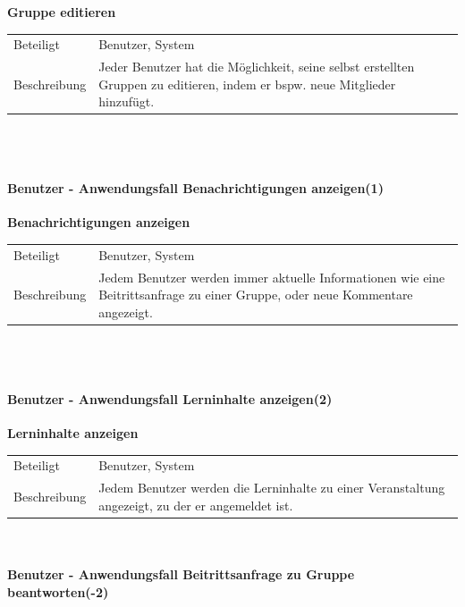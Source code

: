 \documentclass[12pt,a4paper]{article}
\begin{document}
\textbf{Gruppe editieren}\\
\begin{tabular}{l|p{12cm}}
\hline 
Beteiligt & Benutzer, System \\ 
Beschreibung & Jeder Benutzer hat die Möglichkeit, seine selbst erstellten Gruppen zu editieren, indem er bspw. neue Mitglieder hinzufügt. \\ 
\end{tabular}\\\\


\paragraph{Benutzer - Anwendungsfall \glqq Benachrichtigungen anzeigen\grqq  (1)}\mbox{}

\textbf{Benachrichtigungen anzeigen}\\
\begin{tabular}{l|p{12cm}}
\hline 
Beteiligt & Benutzer, System \\ 
Beschreibung & Jedem Benutzer werden immer aktuelle Informationen wie eine Beitrittsanfrage zu einer Gruppe, oder neue Kommentare angezeigt. \\ 
\end{tabular}\\\\
 


\paragraph{Benutzer - Anwendungsfall \glqq Lerninhalte anzeigen\grqq  (2)}\mbox{}

\textbf{Lerninhalte anzeigen}\\
\begin{tabular}{l|p{12cm}}
\hline 
Beteiligt & Benutzer, System  \\ 
Beschreibung & Jedem Benutzer werden die Lerninhalte zu einer Veranstaltung angezeigt, zu der er angemeldet ist. \\ 
\end{tabular}\\


\paragraph{Benutzer - Anwendungsfall \glqq Beitrittsanfrage zu Gruppe beantworten\grqq (-2)}\mbox{}
\end{document}
